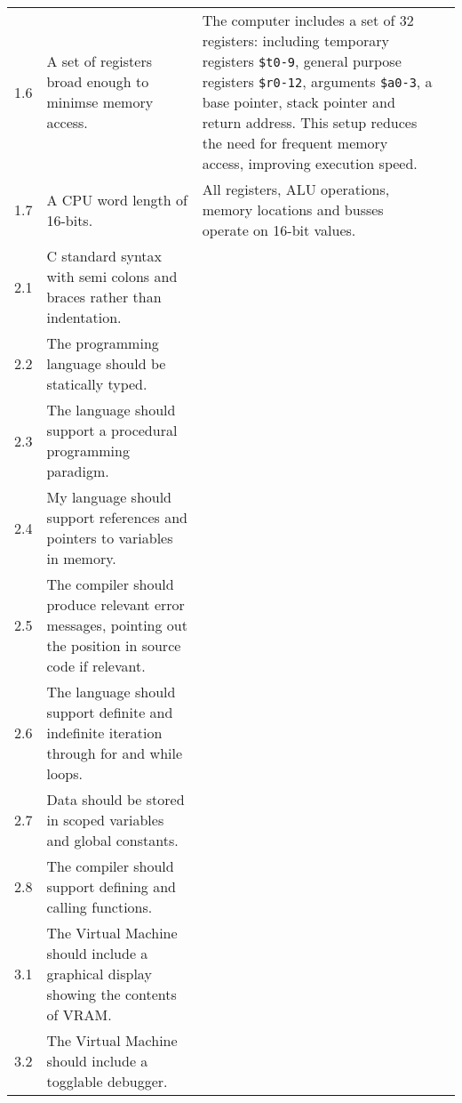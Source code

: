 \begin{longtable}{|p{1cm}|p{5cm}|p{6cm}|p{2cm}|}
        & 
        \\
    \hline
        1.6 
        & 
        A set of registers broad enough to minimse memory access. 
        &
        The computer includes a set of 32 registers: including temporary registers \texttt{\$t0-9}, general purpose registers \texttt{\$r0-12}, arguments \texttt{\$a0-3}, a base pointer, stack pointer and return address. This setup reduces the need for frequent memory access, improving execution speed. 
        & 
        \\
    \hline
        1.7 & 
        A CPU word length of 16-bits. &
        All registers, ALU operations, memory locations and busses operate on 16-bit values.
        &
        \\
    \hline
        2.1 & 
        C standard syntax with semi colons and braces rather than indentation. &
        & \\
    \hline
        2.2 & 
        The programming language should be statically typed. &
        & \\
    \hline
        2.3 & 
        The language should support a procedural programming paradigm. &
        & \\
    \hline
        2.4 & 
        My language should support references and pointers to variables in memory. & 
        &\\
    \hline
        2.5 & 
        The compiler should produce relevant error messages, pointing out the position in source code if relevant. &
        &
        \\
    \hline
        2.6 & 
        The language should support definite and indefinite iteration through for and while loops. &
        &
        \\
    \hline
        2.7 & 
        Data should be stored in scoped variables and global constants. & 
        &
        \\
    \hline
        2.8 & 
        The compiler should support defining and calling functions. &
        &
        \\
    \hline
        3.1 & 
        The Virtual Machine should include a graphical display showing the contents of VRAM. &
        &
        \\
    \hline
        3.2 & 
        The Virtual Machine should include a togglable debugger. &
        & \\
    \hline
\end{longtable}